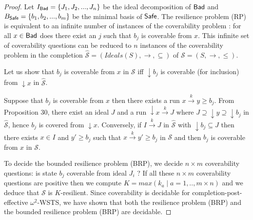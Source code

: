 \begin{proof}
Let $I_{\textsf{Bad}}=\{J_1, J_2,...,J_n\}$ be the ideal decomposition of $\textsf{Bad}$ and $B_{\textsf{Safe}}=\{b_1,b_2,...,b_m\}$ be the minimal basis of $\textsf{Safe}$.
The %
resilience problem (RP) is equivalent to an infinite number of instances of the coverability problem : for all $x \in \textsf{Bad}$ does there exist an $j$ such that $b_j$ is coverable from $x$. This infinite set of coverability questions can be reduced to $n$ instances of the coverability problem in the completion $\hat{\mathscr{S}}=(Ideals(S),\rightarrow, \subseteq)$ of $\mathscr{S}=(S,\rightarrow, \leq)$.


Let us show that $b_j$ is coverable from $x$ in $\mathscr{S}$ iff $\downarrow b_j$ is coverable (for inclusion) from $\downarrow x$ in $\hat{\mathscr{S}}$.

Suppose that $b_j$ is coverable from $x$ then there exists a run $x \xrightarrow{k} y \geq b_j$. From Proposition 30, there exist an ideal $J$ and a run $\downarrow x \xrightarrow{k} J$ where $J \supseteq \downarrow y \supseteq \downarrow b_j$ in $\hat{\mathscr{S}}$, hence $b_j$ is covered from $\downarrow x$.
Conversely, if $I \xrightarrow{k} J$ in $\hat{\mathscr{S}}$ with $\downarrow b_j \subseteq J$ then 
there exists $x \in I$ and $y' \geq b_j$ such that $x \xrightarrow{k} y'  \geq b_j$ in $\mathscr{S}$ and then $b_j$ is coverable from $x$ in $\mathscr{S}$.

%

To decide the  bounded resilience problem (BRP), we decide $n \times m$ coverability questions: is state $b_j$ coverable from ideal $J_i$ ? If all these $n \times m$ coverability questions are positive then we compute $K=max(k_a \mid a=1,..,m \times n)$ and we deduce that  $\mathscr{S}$ is   $K$-resilient. Since coverability is decidable for completion-post-effective $\omega^2$-WSTS, we have shown that both the 
  resilience problem (BRP) and the  
  bounded resilience problem (BRP) are decidable.
\end{proof}


